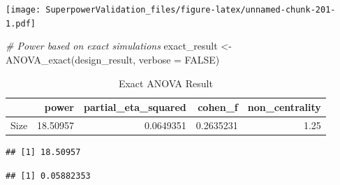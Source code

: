 \documentclass[
]{book}
\newenvironment{Shaded}{\begin{snugshade}}{\end{snugshade}}
\newcommand{\AttributeTok}[1]{\textcolor[rgb]{0.77,0.63,0.00}{#1}}
\newcommand{\CommentTok}[1]{\textcolor[rgb]{0.56,0.35,0.01}{\textit{#1}}}
\newcommand{\ConstantTok}[1]{\textcolor[rgb]{0.00,0.00,0.00}{#1}}
\newcommand{\FunctionTok}[1]{\textcolor[rgb]{0.00,0.00,0.00}{#1}}
\newcommand{\NormalTok}[1]{#1}
\newcommand{\OtherTok}[1]{\textcolor[rgb]{0.56,0.35,0.01}{#1}}
\newcommand{\SpecialCharTok}[1]{\textcolor[rgb]{0.00,0.00,0.00}{#1}}
\begin{document}
\texttt{[image: SuperpowerValidation\_files/figure-latex/unnamed-chunk-201-1.pdf]}

\begin{Shaded}
\begin{Highlighting}[]
\CommentTok{\# Power based on exact simulations}
\NormalTok{exact\_result }\OtherTok{\textless{}{-}} \FunctionTok{ANOVA\_exact}\NormalTok{(design\_result,}
                            \AttributeTok{verbose =} \ConstantTok{FALSE}\NormalTok{)}
\end{Highlighting}
\end{Shaded}

\begin{table}[!h]

\caption{\label{tab:unnamed-chunk-202}Exact ANOVA Result}
\centering
\begin{tabular}[t]{l|r|r|r|r}
\hline
  & power & partial\_eta\_squared & cohen\_f & non\_centrality\\
\hline
Size & 18.50957 & 0.0649351 & 0.2635231 & 1.25\\
\hline
\end{tabular}
\end{table}

\begin{Shaded}
\end{Shaded}

\begin{verbatim}
## [1] 18.50957
\end{verbatim}

\begin{Shaded}
\end{Shaded}

\begin{verbatim}
## [1] 0.05882353
\end{verbatim}

\begin{Shaded}
\end{Shaded}
\end{document}
